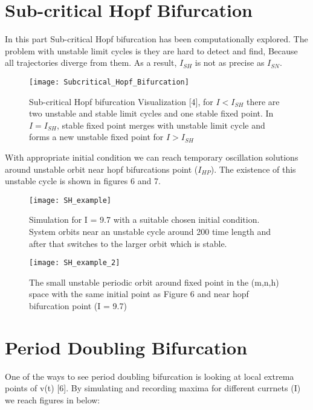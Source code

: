 \documentclass{article}
\begin{document}
	\section{Sub-critical Hopf Bifurcation}
		In this part Sub-critical Hopf bifurcation has been computationally explored. The problem with unstable limit cycles is they are hard to detect and find, Because all trajectories diverge from them. As a result, $I_{SH}$ is not as precise as $I_{SN}$.
	
		\begin{figure}[H]
			\centering
			\texttt{[image: Subcritical\_Hopf\_Bifurcation]}
			\caption{Sub-critical Hopf bifurcation Visualization 	[4], for $I < I_{SH}$ there are two unstable and stable limit cycles and one stable fixed point. In $I=I_{SH}$, stable fixed point merges with unstable limit cycle and forms a new unstable fixed point for $I>I_{SH}$}
			\label{fig:subcriticalhopfbifurcation}
		\end{figure}
		
		With appropriate initial condition we can reach temporary oscillation solutions around unstable orbit near hopf bifurcations point ($I_{HP}$). The existence of this unstable cycle is shown in figures 6 and 7.
		
				
		\begin{figure}[H]
			\centering
			\texttt{[image: SH\_example]}
			\caption{Simulation for I = 9.7 with a suitable chosen initial condition. System orbits near an unstable cycle around 200 time length and after that switches to the larger orbit which is stable. }
			\label{fig:shexample}
		\end{figure}
		\begin{figure}[H]
			\centering
			\texttt{[image: SH\_example\_2]}
			\caption{The small unstable periodic orbit around fixed point in the (m,n,h) space with the same initial point as Figure 6 and near hopf bifurcation point (I = 9.7)}
			\label{fig:shexample2}
		\end{figure}
	
	
		
		
	\section{Period Doubling Bifurcation}
		One of the ways to see period doubling bifurcation is looking at local extrema points of v(t) [6]. By simulating and recording maxima for different currnets (I) we reach figures in below: \\
		
\end{document}
